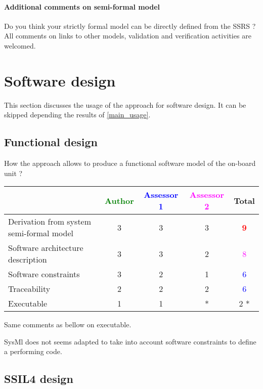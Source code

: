 \paragraph{Additional comments on semi-formal model} Do you think your strictly formal model can be directly defined from the SSRS ?
All comments on links to other models, validation and verification activities are welcomed.

\section{Software design}
This section discusses the usage of the approach for software design.
It can be skipped depending the results of \ref{main_usage}.

\subsection{Functional design}

How the approach allows to produce a functional software model of the on-board unit ?

\begin{tabular}{|l | c | c | c | c|}
\hline
& \textcolor{green}{Author} & \textcolor{blue}{Assessor 1} & \textcolor{magenta}{Assessor 2} & Total \\
\hline
Derivation from system semi-formal model & 3     & 3     & 3     & \textcolor{red}{\textbf{9}} \\
\hline
Software architecture description & 3     & 3     & 2     & \textcolor{magenta}{8} \\
\hline
Software constraints & 3     & 2     & 1     & \textcolor{blue}{6} \\
\hline
Traceability & 2     & 2     & 2     & \textcolor{blue}{6} \\
\hline
Executable & 1     & 1     & * & 2    * \\
\hline
\end{tabular}



\begin{assessor2}
Same comments as bellow on executable.

SysMl does not seems adapted to take into account software constraints to define a performing code.
\end{assessor2}

\subsection{SSIL4 design}

